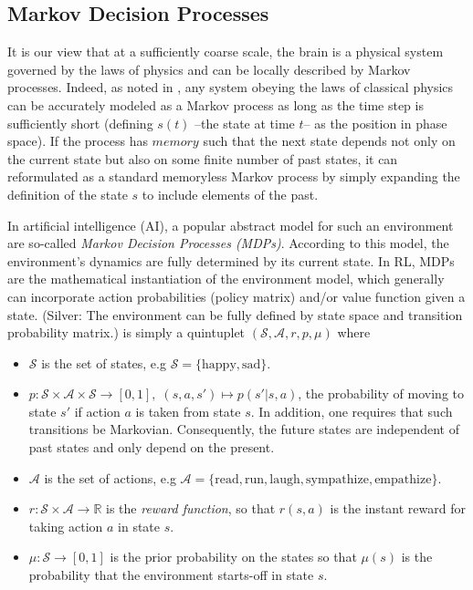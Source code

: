 \documentclass[10pt,letterpaper]{article}
\begin{document}
\subsection{Markov Decision Processes}
It is our view that at a sufficiently coarse scale, the brain is a physical system governed by the laws of
physics and can be locally described by Markov processes. Indeed, as noted in \cite{tegmark2016improved},
any system obeying the laws of classical physics can be accurately modeled as a Markov process as long as the time
step is sufficiently short (defining $s(t)$ --the state at time $t$-- as the position in phase space).
If the process has $memory$ such that the next state depends not only on the current state but also on some finite
number of past states, it can reformulated as a standard memoryless Markov process by simply expanding the
definition of the state $s$ to include elements of the past.

In artificial intelligence (AI), a popular abstract model for such an environment are so-called
\textit{Markov Decision Processes (MDPs)}. According to this model, the environment's dynamics are
fully determined by its current state.
In RL, MDPs are the mathematical instantiation of the environment model,
which generally can incorporate action probabilities (policy matrix)
and/or value function given a state.
(Silver: The environment can be fully defined by state space and
transition probability matrix.)
is simply a quintuplet $(\mathcal S, \mathcal A, r, p, \mu)$ where
\begin{itemize}
\item $\mathcal S$ is the set of states, e.g $\mathcal S = \{\text{happy}, \text{sad}\}$.
\item $p : \mathcal S \times \mathcal A \times \mathcal S \rightarrow [0, 1],\; (s,a,s') \mapsto p(s'|s,a)$,
  the probability of moving to state $s'$ if action $a$ is taken from state $s$. In addition, one requires that such
  transitions be Markovian. Consequently, the future states are independent of past states and only depend on the present.
\item $\mathcal A$ is the set of actions, e.g $\mathcal A = \{\text{read}, \text{run},
  \text{laugh}, \text{sympathize}, \text{empathize}\}.$
\item $r : \mathcal S \times \mathcal A \rightarrow \mathbb R$ is the \textit{reward function},
  so that $r(s, a)$ is the instant reward for taking action $a$ in state $s$.
\item $\mu: \mathcal S \rightarrow [0, 1]$ is the prior probability on the states so that
  $\mu(s)$ is the probability that the environment starts-off in state $s$.
\end{itemize}
\end{document}
